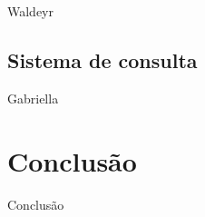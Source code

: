 \documentclass[conference]{IEEEtran}
\begin{document}
Waldeyr

\subsection{Sistema de consulta}

Gabriella

\section{Conclusão}

Conclusão





%
%



%
%
\end{document}
